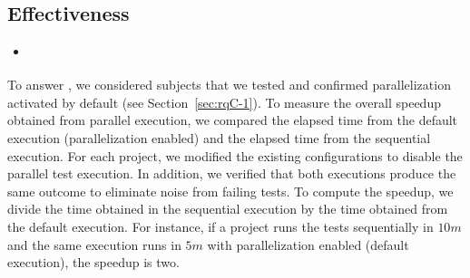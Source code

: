 

\subsection{Effectiveness}
\label{sec:rqD}

\begin{itemize}
    \item \textbf{\RQD}
\end{itemize}

To answer \numRQD{}, we considered \numProjectsPar{} subjects that we
tested and confirmed parallelization activated by default (see
Section~\ref{sec:rqC-1}). To measure the overall speedup obtained from
parallel execution, we compared the elapsed time from the default
execution (parallelization enabled) and the elapsed time from the
sequential execution.  For each project, we modified the existing
configurations to disable the parallel test execution. In addition, we
verified that both executions produce the same outcome to eliminate
noise from failing tests.
To compute the speedup, we divide the time obtained in the sequential
execution by the time obtained from the default execution.  For
instance, if a project runs the tests sequentially in $10m$ and the
same execution runs in $5m$ with parallelization enabled (default
execution), the speedup is two.

\begin{figure}[h!]
\centering
{}
\caption{}
\label{tab:speedup}
\end{figure}

